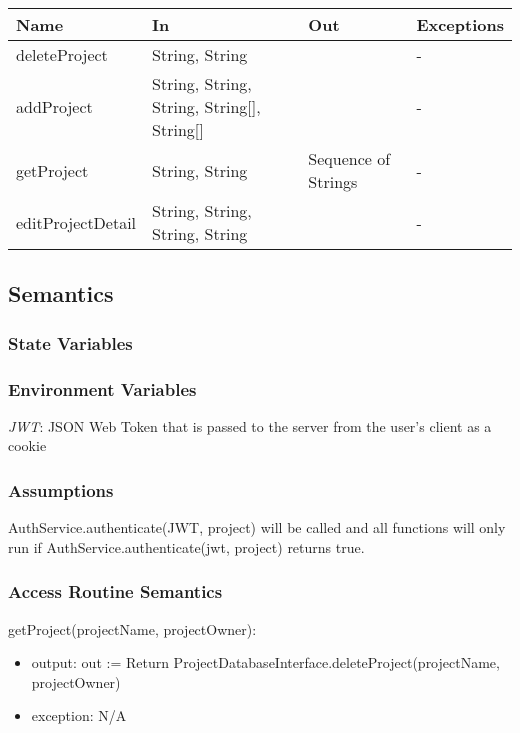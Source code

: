 \documentclass[12pt, titlepage]{article}
\begin{document}
	\footnotesize\begin{center}
		\begin{tabular}{l l l l}
			\hline
			\textbf{Name} & \textbf{In} & \textbf{Out} & \textbf{Exceptions} \\
			\hline
			deleteProject & String, String &  & - \\
			\hline
			addProject & String, String, String, String[], String[] &  & - \\
			\hline
			getProject & String, String & Sequence of Strings & - \\
			\hline
			editProjectDetail & String, String, String, String &  & - \\
			\hline
		\end{tabular}
	\end{center}
	\normalsize
	\subsection{Semantics}
	
	\subsubsection{State Variables}
	
	
	\subsubsection{Environment Variables}
	\noindent \textit{JWT}: JSON Web Token that is passed to the server from the user's client as a cookie
	
	\subsubsection{Assumptions}
	AuthService.authenticate(JWT, project) will be called and all functions will only run if AuthService.authenticate(jwt, project) returns true.
	
	\subsubsection{Access Routine Semantics}
	
	\noindent getProject(projectName, projectOwner):
	\begin{itemize}
		\item output: out := Return ProjectDatabaseInterface.deleteProject(projectName, projectOwner)
		
		\item exception: N/A
	\end{itemize}
	
\end{document}
